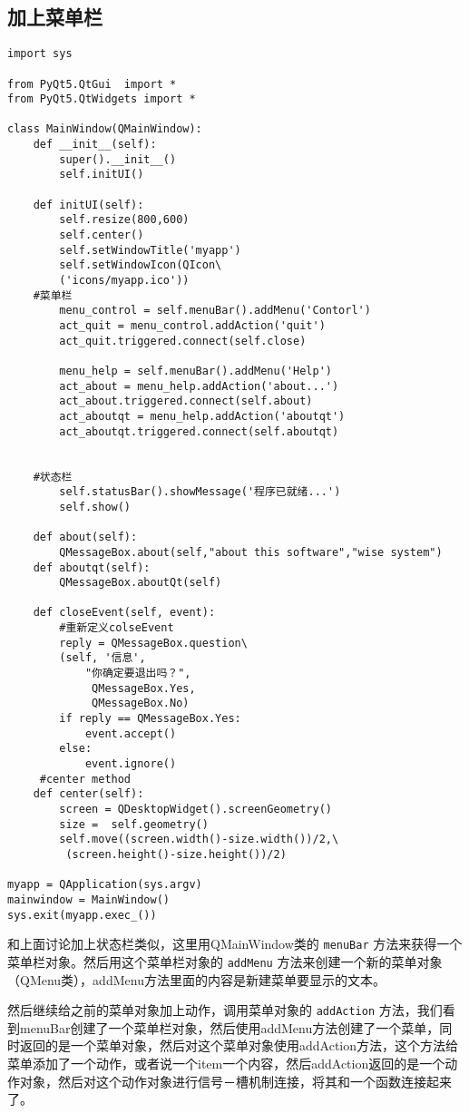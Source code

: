\documentclass[11pt,oneside]{article}
\begin{document}
\subsection{加上菜单栏}
\label{sec:orgheadline13}
\begin{verbatim}
import sys

from PyQt5.QtGui  import *
from PyQt5.QtWidgets import *

class MainWindow(QMainWindow):
    def __init__(self):
        super().__init__()
        self.initUI()

    def initUI(self):
        self.resize(800,600)
        self.center()
        self.setWindowTitle('myapp')
        self.setWindowIcon(QIcon\
        ('icons/myapp.ico'))
    #菜单栏
        menu_control = self.menuBar().addMenu('Contorl')
        act_quit = menu_control.addAction('quit')
        act_quit.triggered.connect(self.close)

        menu_help = self.menuBar().addMenu('Help')
        act_about = menu_help.addAction('about...')
        act_about.triggered.connect(self.about)
        act_aboutqt = menu_help.addAction('aboutqt')
        act_aboutqt.triggered.connect(self.aboutqt)


    #状态栏
        self.statusBar().showMessage('程序已就绪...')
        self.show()

    def about(self):
        QMessageBox.about(self,"about this software","wise system")
    def aboutqt(self):
        QMessageBox.aboutQt(self)

    def closeEvent(self, event):
        #重新定义colseEvent
        reply = QMessageBox.question\
        (self, '信息',
            "你确定要退出吗？",
             QMessageBox.Yes,
             QMessageBox.No)
        if reply == QMessageBox.Yes:
            event.accept()
        else:
            event.ignore()
     #center method
    def center(self):
        screen = QDesktopWidget().screenGeometry()
        size =  self.geometry()
        self.move((screen.width()-size.width())/2,\
         (screen.height()-size.height())/2)

myapp = QApplication(sys.argv)
mainwindow = MainWindow()
sys.exit(myapp.exec_())
\end{verbatim}
和上面讨论加上状态栏类似，这里用QMainWindow类的 \texttt{menuBar} 方法来获得一个菜单栏对象。然后用这个菜单栏对象的 \texttt{addMenu} 方法来创建一个新的菜单对象（QMenu类），addMenu方法里面的内容是新建菜单要显示的文本。

然后继续给之前的菜单对象加上动作，调用菜单对象的 \texttt{addAction} 方法，我们看到menuBar创建了一个菜单栏对象，然后使用addMenu方法创建了一个菜单，同时返回的是一个菜单对象，然后对这个菜单对象使用addAction方法，这个方法给菜单添加了一个动作，或者说一个item一个内容，然后addAction返回的是一个动作对象，然后对这个动作对象进行信号－槽机制连接，将其和一个函数连接起来了。
\end{document}
